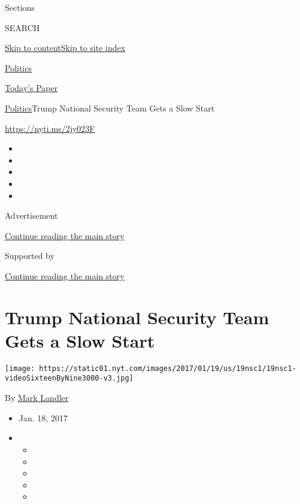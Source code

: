 Sections

SEARCH

\protect\hyperlink{site-content}{Skip to
content}\protect\hyperlink{site-index}{Skip to site index}

\href{https://www.nytimes.com/section/politics}{Politics}

\href{https://myaccount.nytimes.com/auth/login?response_type=cookie\&client_id=vi}{}

\href{https://www.nytimes.com/section/todayspaper}{Today's Paper}

\href{/section/politics}{Politics}\textbar{}Trump National Security Team
Gets a Slow Start

\url{https://nyti.ms/2jy023F}

\begin{itemize}
\item
\item
\item
\item
\item
\end{itemize}

Advertisement

\protect\hyperlink{after-top}{Continue reading the main story}

Supported by

\protect\hyperlink{after-sponsor}{Continue reading the main story}

\hypertarget{trump-national-security-team-gets-a-slow-start}{%
\section{Trump National Security Team Gets a Slow
Start}\label{trump-national-security-team-gets-a-slow-start}}

\texttt{[image: https://static01.nyt.com/images/2017/01/19/us/19nsc1/19nsc1-videoSixteenByNine3000-v3.jpg]}

By \href{http://www.nytimes.com/by/mark-landler}{Mark Landler}

\begin{itemize}
\item
  Jan. 18, 2017
\item
  \begin{itemize}
  \item
  \item
  \item
  \item
  \item
  \end{itemize}
\end{itemize}

